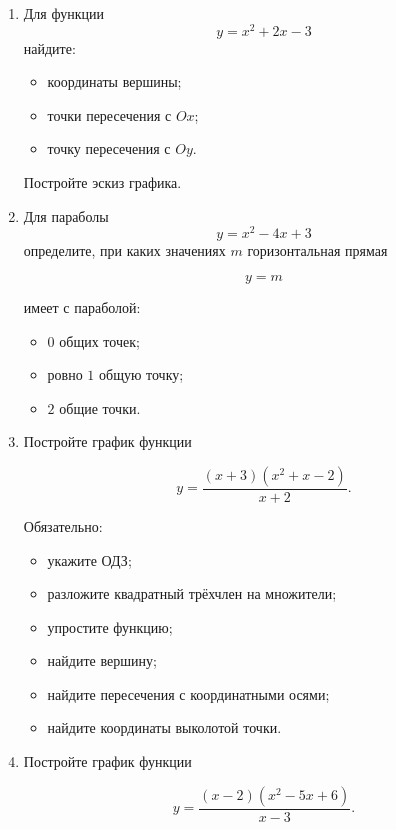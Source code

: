 \documentclass[a4paper,12pt]{article}
\begin{document}
\begin{enumerate}[label=\textbf{\arabic*.}]

\item
Для функции
\[
y=x^2+2x-3
\]
найдите:

\begin{itemize}
  \item координаты вершины;
  \item точки пересечения с \(Ox\);
  \item точку пересечения с \(Oy\).
\end{itemize}

Постройте эскиз графика.

\vspace{5mm}

\item
Для параболы
\[
y=x^2-4x+3
\]
определите, при каких значениях \(m\) горизонтальная прямая

\[
y=m
\]

имеет с параболой:

\begin{itemize}
  \item \(0\) общих точек;
  \item ровно \(1\) общую точку;
  \item \(2\) общие точки.
\end{itemize}

\vspace{5mm}

\item
Постройте график функции

\[
y=
\frac{(x+3)(x^2+x-2)}{x+2}.
\]

Обязательно:

\begin{itemize}
  \item укажите ОДЗ;
  \item разложите квадратный трёхчлен на множители;
  \item упростите функцию;
  \item найдите вершину;
  \item найдите пересечения с координатными осями;
  \item найдите координаты выколотой точки.
\end{itemize}

\vspace{5mm}

\item
Постройте график функции

\[
y=
\frac{(x-2)(x^2-5x+6)}{x-3}.
\]


\end{enumerate}
\end{document}
